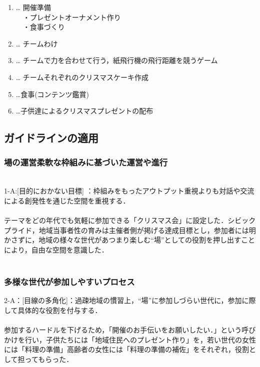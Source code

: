 \documentclass[a4paper]{jsarticle}
\begin{document}
\begin{enumerate}
\item  … 開催準備\\
　・プレゼントオーナメント作り\\
　・食事づくり
\item  … チームわけ
\item … チームで力を合わせて行う，紙飛行機の飛行距離を競うゲーム
\item  … チームそれぞれのクリスマスケーキ作成
\item …食事(コンテンツ鑑賞)
\item …子供達によるクリスマスプレゼントの配布\\
\end{enumerate}



\subsection{ガイドラインの適用}
\subsubsection{場の運営柔軟な枠組みに基づいた運営や進行}\\
1-A:[目的におかない目標] ：枠組みをもったアウトプット重視よりも対話や交流による創発性を通じた空間を重視する．\\\\
テーマをどの年代でも気軽に参加できる「クリスマス会」に設定した．シビックプライド，地域当事者性の育みは主催者側が掲げる達成目標とし，参加者には明かさずに，地域の様々な世代があつまり楽しむ“場”としての役割を押し出すことにより，自由な空間を意識した．\\\\

\subsubsection{多様な世代が参加しやすいプロセス}
2-A：[目線の多角化]：過疎地域の慣習上，“場”に参加しづらい世代に，参加に際して具体的な役割を付与する．\\\\
参加するハードルを下げるため，「開催のお手伝いをお願いしたい．」という呼びかけを行い，子供たちには「地域住民へのプレゼント作り」を，若い世代の女性には「料理の準備」高齢者の女性には「料理の準備の補佐」をそれぞれ，役割として担ってもらった．\\\\
\end{document}
